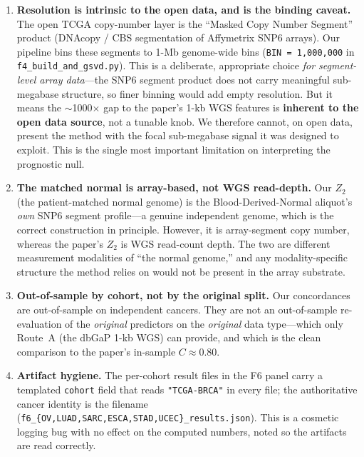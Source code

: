 \documentclass[11pt]{article}
\begin{document}
\begin{enumerate}[leftmargin=*]
  \item \textbf{Resolution is intrinsic to the open data, and is the binding
    caveat.} The open TCGA copy-number layer is the ``Masked Copy Number
    Segment'' product (DNAcopy / CBS segmentation of Affymetrix SNP6 arrays). Our
    pipeline bins these segments to 1-Mb genome-wide bins
    (\texttt{BIN = 1{,}000{,}000} in \texttt{f4\_build\_and\_gsvd.py}). This is a
    deliberate, appropriate choice \emph{for segment-level array data}---the SNP6
    segment product does not carry meaningful sub-megabase structure, so finer
    binning would add empty resolution. But it means the $\sim$1000$\times$ gap to
    the paper's 1-kb WGS features is \textbf{inherent to the open data source},
    not a tunable knob. We therefore cannot, on open data, present the method with
    the focal sub-megabase signal it was designed to exploit. This is the single
    most important limitation on interpreting the prognostic null.
  \item \textbf{The matched normal is array-based, not WGS read-depth.} Our
    $Z_2$ (the patient-matched normal genome) is the Blood-Derived-Normal
    aliquot's \emph{own} SNP6 segment profile---a genuine independent genome,
    which is the correct construction in principle. However, it is array-segment
    copy number, whereas the paper's $Z_2$ is WGS read-count depth. The two are
    different measurement modalities of ``the normal genome,'' and any
    modality-specific structure the method relies on would not be present in the
    array substrate.
  \item \textbf{Out-of-sample by cohort, not by the original split.} Our
    concordances are out-of-sample on independent cancers. They are not an
    out-of-sample re-evaluation of the \emph{original} predictors on the
    \emph{original} data type---which only Route~A (the dbGaP 1-kb WGS) can
    provide, and which is the clean comparison to the paper's in-sample
    $C \approx 0.80$.
  \item \textbf{Artifact hygiene.} The per-cohort result files in the F6 panel
    carry a templated \texttt{cohort} field that reads \texttt{"TCGA-BRCA"} in
    every file; the authoritative cancer identity is the filename
    (\texttt{f6\_\{OV,LUAD,SARC,ESCA,STAD,UCEC\}\_results.json}). This is a
    cosmetic logging bug with no effect on the computed numbers, noted so the
    artifacts are read correctly.
\end{enumerate}
\end{document}
